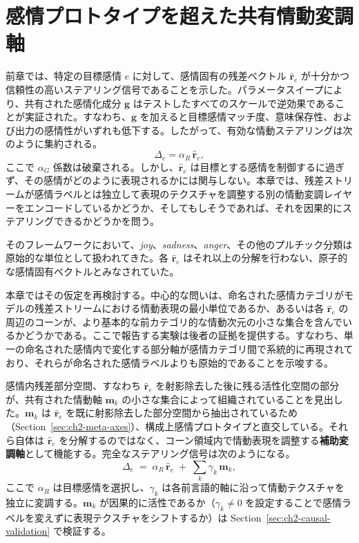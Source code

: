 \chapter{感情プロトタイプを超えた共有情動変調軸}
\label{chap:development2_preverbal_vectors}

前章では、特定の目標感情 $e$ に対して、感情固有の残差ベクトル $\hat{\mathbf{r}}_e$ が十分かつ信頼性の高いステアリング信号であることを示した。パラメータスイープにより、共有された感情化成分 $\mathbf{g}$ はテストしたすべてのスケールで逆効果であることが実証された。すなわち、$\mathbf{g}$ を加えると目標感情マッチ度、意味保存性、および出力の感情性がいずれも低下する。したがって、有効な情動ステアリングは次のように集約される。
\[
\Delta_e = \alpha_R\,\hat{\mathbf{r}}_e,
\]
ここで $\alpha_G$ 係数は破棄される。しかし、$\hat{\mathbf{r}}_e$ は目標とする感情を制御するに過ぎず、その感情がどのように表現されるかには関与しない。本章では、残差ストリームが感情ラベルとは独立して表現のテクスチャを調整する別の情動変調レイヤーをエンコードしているかどうか、そしてもしそうであれば、それを因果的にステアリングできるかどうかを問う。\par

そのフレームワークにおいて、\textit{joy}、\textit{sadness}、\textit{anger}、その他のプルチック分類は原始的な単位として扱われてきた。各 $\hat{\mathbf{r}}_e$ はそれ以上の分解を行わない、原子的な感情固有ベクトルとみなされていた。\par

本章ではその仮定を再検討する。中心的な問いは、命名された感情カテゴリがモデルの残差ストリームにおける情動表現の最小単位であるか、あるいは各 $\hat{\mathbf{r}}_e$ の周辺のコーンが、より基本的な前カテゴリ的な情動次元の小さな集合を含んでいるかどうかである。ここで報告する実験は後者の証拠を提供する。すなわち、単一の命名された感情内で変化する部分軸が感情カテゴリ間で系統的に再現されており、それらが命名された感情ラベルよりも原始的であることを示唆する。\par

感情内残差部分空間、すなわち $\hat{\mathbf{r}}_e$ を射影除去した後に残る活性化空間の部分が、共有された情動軸 $\mathbf{m}_k$ の小さな集合によって組織されていることを見出した。$\mathbf{m}_k$ は $\hat{\mathbf{r}}_e$ を既に射影除去した部分空間から抽出されているため（Section~\ref{sec:ch2-meta-axes}）、構成上感情プロトタイプと直交している。それら自体は $\hat{\mathbf{r}}_e$ を分解するのではなく、コーン領域内で情動表現を調整する\textbf{補助変調軸}として機能する。完全なステアリング信号は次のようになる。
\[
\Delta_e \;=\; \alpha_R\,\hat{\mathbf{r}}_e \;+\; \sum_{k}\gamma_k\,\mathbf{m}_k,
\]
ここで $\alpha_R$ は目標感情を選択し、$\gamma_k$ は各前言語的軸に沿って情動テクスチャを独立に変調する。$\mathbf{m}_k$ が因果的に活性であるか（$\gamma_k \neq 0$ を設定することで感情ラベルを変えずに表現テクスチャをシフトするか）は Section~\ref{sec:ch2-causal-validation} で検証する。\par


